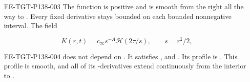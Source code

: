 \begin{lemma}\label{lem:A.6}
\begin{EESegment}{EE-TGT-P138-003}
The function  is positive and is smooth from the right all the way to
. Every fixed derivative stays bounded on each bounded nonnegative interval. The field
\end{EESegment}
\begin{equation}
 K(r,t)=c_\infty s^{-A}\mathcal H(2\tau/s),\qquad s=r^2/2,
 \tag{A.33}\label{eq:A.33}
\end{equation}
\begin{EESegment}{EE-TGT-P138-004}
does not depend on . It satisfies
, and
. Its profile is
. This profile is smooth, and all of its
-derivatives extend continuously from the interior to
.
\end{EESegment}
\end{lemma}
